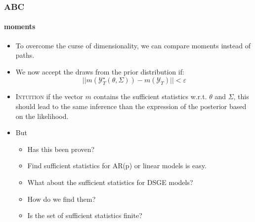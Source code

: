 \documentclass[10pt]{beamer}
\begin{document}
\begin{frame}
  \frametitle{ABC}
  \framesubtitle{moments}

  \begin{itemize}

  \item To overcome the curse of dimensionality, we can compare moments instead of paths.\newline

  \item We now accept the draws from the prior distribution if:
    \[
      ||m\left(\mathcal Y_T^\star(\theta,\Sigma)\right)-m(\mathcal Y_T)||<\varepsilon
    \]
    
  \item \textsc{Intuition} if the vector $m$ contains the sufficient
    statistics w.r.t. $\theta$ and $\Sigma$, this should lead to the
    same inference than the expression of the posterior based on
    the likelihood.\newline

  \item But
    \begin{itemize}
    \item Has this been proven?
    \item Find sufficient statistics for AR(p) or linear models is easy. 
    \item What about the sufficient statistics for DSGE models?
    \item How do we find them?
    \item Is the set of sufficient statistics finite?
    \end{itemize}
    
  \end{itemize}
\end{frame}
\end{document}
